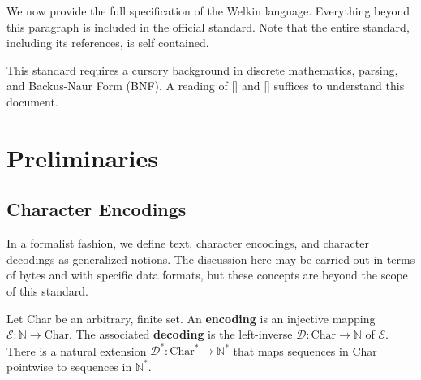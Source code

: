 

We now provide the full specification of the Welkin language. Everything beyond this paragraph is included in the official standard. Note that the entire standard, including its references, is self contained.


This standard requires a cursory background in discrete mathematics, parsing, and Backus-Naur Form (BNF). A reading of [] and [] suffices to understand this document.

\section{Preliminaries}

\newcommand*{\chars}{\mathrm{CHAR}}
\newcommand*{\numbers}{\mathrm{NUMBER}}
\newcommand*{\whitespaces}{\mathrm{WHITE\_SPACES}}
\newcommand*{\reserved}{\mathrm{RESERVED}}
\newcommand*{\strings}{\mathrm{STRING}}
\newcommand*{\term}{\mathrm{term}}
\newcommand*{\terms}{\mathrm{terms}}
\newcommand*{\delimiters}{\mathrm{DELIMITERS}}
\newcommand*{\encoding}{\mathcal{E}}
\newcommand*{\decoding}{\mathcal{D}}

\newcommand*{\scope}{\textrm{scope}}


\subsection{Character Encodings}
In a formalist fashion, we define text, character encodings, and character decodings as generalized notions. The discussion here may be carried out in terms of bytes and with specific data formats, but these concepts are beyond the scope of this standard.

Let Char be an arbitrary, finite set. An \textbf{encoding} is an injective mapping $\encoding : \mathbb{N} \to \textrm{Char}.$ The associated \textbf{decoding} is the left-inverse $\decoding: \mathrm{Char} \to \mathbb{N}$ of $\encoding.$ There is a natural extension $\decoding^{*}: \textrm{Char}^{*} \to \mathbb{N}^{*}$
that maps sequences in Char pointwise to sequences in $\mathbb{N}^{*}.$

